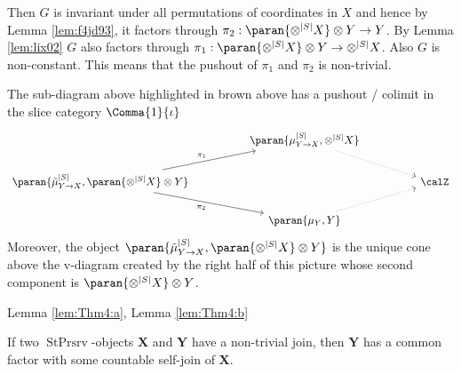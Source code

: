 \documentclass[12pt,oneside,pb-diagram]{article}
\DeclareMathOperator{\sps}{StPrsrv}
\begin{document}
Then $G$ is invariant under all permutations of coordinates in $X$ and hence by Lemma \ref{lem:f4jd93}, it factors through $\pi_2 : \paran{\otimes^{|S|} X} \otimes Y \to Y$. By Lemma \ref{lem:lix02} $G$ also factors through $\pi_1 : \paran{\otimes^{|S|} X} \otimes Y \to \otimes^{|S|} X$. Also $G$ is non-constant. This means that the pushout of $\pi_1$ and $\pi_2$ is non-trivial.

\begin{theorem}  \label{thm:push_pull}
	The sub-diagram above highlighted in brown above has a pushout / colimit in the slice category $\Comma{1}{\iota}$
	\begin{equation} \label{eqn:thm:push_pull}
		\begin{tikzcd}
			&& \paran{ \mu_{Y\to X}^{|S|}, \otimes^{|S|} X } \arrow[dotted, drr] \\
			\paran{ \tilde{\mu}_{Y\to X}^{|S|}, \paran{\otimes^{|S|} X} \otimes Y } \arrow[urr, "\pi_1"] \arrow[drr, "\pi_2"'] && && \calZ \\
			&& \paran{\mu_Y, Y} \arrow[dotted, urr]
		\end{tikzcd}
	\end{equation}
	Moreover, the object $\paran{ \tilde{\mu}_{Y\to X}^{|S|}, \paran{\otimes^{|S|} X} \otimes Y }$ is the unique cone above the v-diagram created by the right half of this picture whose second component is $\paran{\otimes^{|S|} X} \otimes Y$.
\end{theorem}

Lemma \ref{lem:Thm4:a}, Lemma \ref{lem:Thm4:b} 

\begin{lemma}  \label{lem:iskz8}
	\cite[Thm 6.25]{glasner2015join} 
\end{lemma}

\begin{corollary} \label{cor:rel_ind}
	\cite[Thm 3.6]{Rue2006join} \cite{GlasnerWeiss2003past} \cite[Thm 4]{LemanczykEtAl1993gaussian} If two $\sps$-objects $\mathbf{X}$ and $\mathbf{Y}$ have a non-trivial join, then $\mathbf{Y}$ has a common factor with some countable self-join of $\mathbf{X}$.
\end{corollary}
\end{document}

